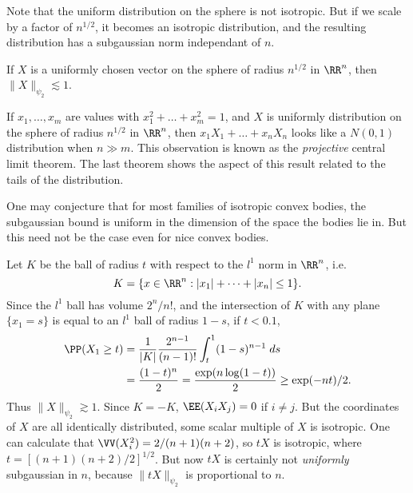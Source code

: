 Note that the uniform distribution on the sphere is not isotropic. But if we scale by a factor of $n^{1/2}$, it becomes an isotropic distribution, and the resulting distribution has a subgaussian norm independant of $n$.

\begin{corollary}
    If $X$ is a uniformly chosen vector on the sphere of radius $n^{1/2}$ in $\RR^n$, then $\| X \|_{\psi_2} \lesssim 1$.
\end{corollary}

If $x_1, \dots, x_m$ are values with $x_1^2 + \dots + x_m^2 = 1$, and $X$ is uniformly distribution on the sphere of radius $n^{1/2}$ in $\RR^n$, then $x_1 X_1 + \dots + x_n X_n$ looks like a $N(0,1)$ distribution when $n \gg m$. This observation is known as the {\it projective} central limit theorem. The last theorem shows the aspect of this result related to the tails of the distribution.

One may conjecture that for most families of isotropic convex bodies, the subgaussian bound is uniform in the dimension of the space the bodies lie in. But this need not be the case even for nice convex bodies.

\begin{example}
    Let $K$ be the ball of radius $t$ with respect to the $l^1$ norm in $\RR^n$, i.e.
    \[ K = \{ x \in \RR^n: |x_1| + \dots + |x_n| \leq 1 \}. \]
    Since the $l^1$ ball has volume $2^n/n!$, and the intersection of $K$ with any plane $\{ x_1 = s \}$ is equal to an $l^1$ ball of radius $1 - s$, if $t < 0.1$,
    \begin{align*}
        \PP(X_1 \geq t) &= \frac{1}{|K|} \frac{2^{n-1}}{(n-1)!} \int_t^1 (1-s)^{n-1}\; ds\\
        &= \frac{(1 - t)^n}{2} = \frac{\exp(n \log(1-t))}{2} \geq \exp(-nt)/2.
    \end{align*}
    Thus $\| X \|_{\psi_2} \gtrsim 1$. Since $K = -K$, $\EE(X_iX_j) = 0$ if $i \neq j$. But the coordinates of $X$ are all identically distributed, some scalar multiple of $X$ is isotropic. One can calculate that $\VV(X_i^2) = 2/(n+1)(n+2)$, so $tX$ is isotropic, where $t = [(n+1)(n+2)/2]^{1/2}$. But now $tX$ is certainly not {\it uniformly} subgaussian in $n$, because $\| tX \|_{\psi_2}$ is proportional to $n$.
\end{example}


